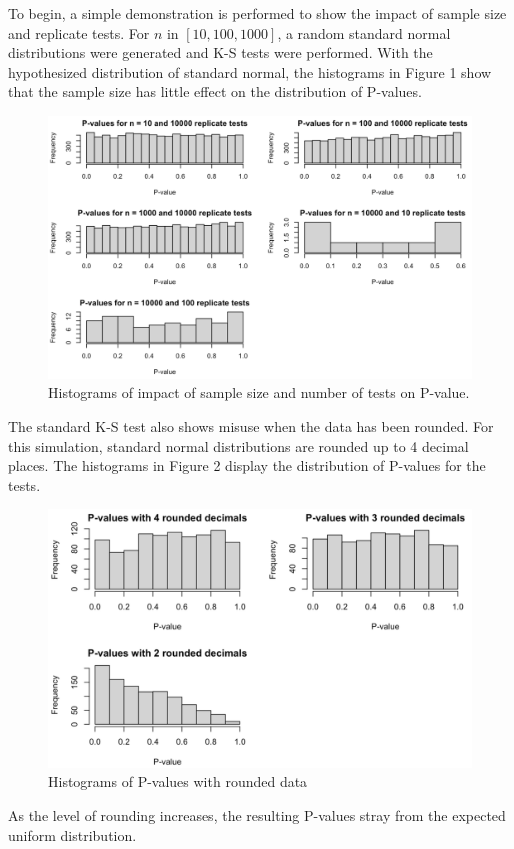 \documentclass[12pt, letterpaper, titlepage]{article}
\begin{document}
To begin, a simple demonstration is performed to show the impact of sample size and replicate tests. For $n$ in $[10, 100, 1000]$, a random standard normal distributions were generated and K-S tests were performed. With the hypothesized distribution of standard normal, the histograms in Figure 1 show that the sample size has little effect on the distribution of P-values.

\begin{figure}[!ht]
  \centering
  \includegraphics[width=0.8\linewidth]{Fig1}
  \caption{Histograms of impact of sample size and number of tests on P-value.}
  \label{fig:Fig1}
\end{figure}

The standard K-S test also shows misuse when the data has been rounded. For this simulation, standard normal distributions are rounded up to 4 decimal places. The histograms in Figure 2 display the distribution of P-values for the tests.

\begin{figure}[!ht]
  \centering
  \includegraphics[width=0.8\linewidth]{Fig2}
  \caption{Histograms of P-values with rounded data}
  \label{fig:Fig2}
\end{figure}

As the level of rounding increases, the resulting P-values stray from the expected uniform distribution.
\end{document}
